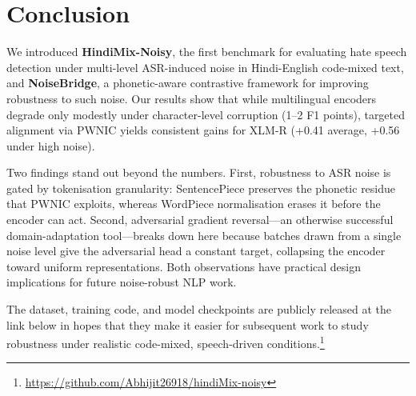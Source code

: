 \documentclass[conference]{IEEEtran}
\begin{document}
\section{Conclusion}

We introduced \textbf{HindiMix-Noisy}, the first benchmark for evaluating hate speech detection under multi-level ASR-induced noise in Hindi-English code-mixed text, and \textbf{NoiseBridge}, a phonetic-aware contrastive framework for improving robustness to such noise. Our results show that while multilingual encoders degrade only modestly under character-level corruption (1--2 F1 points), targeted alignment via PWNIC yields consistent gains for XLM-R (+0.41 average, +0.56 under high noise).

Two findings stand out beyond the numbers. First, robustness to ASR noise is gated by tokenisation granularity: SentencePiece preserves the phonetic residue that PWNIC exploits, whereas WordPiece normalisation erases it before the encoder can act. Second, adversarial gradient reversal---an otherwise successful domain-adaptation tool---breaks down here because batches drawn from a single noise level give the adversarial head a constant target, collapsing the encoder toward uniform representations. Both observations have practical design implications for future noise-robust NLP work.

The dataset, training code, and model checkpoints are publicly released at the link below in hopes that they make it easier for subsequent work to study robustness under realistic code-mixed, speech-driven conditions.\footnote{\url{https://github.com/Abhijit26918/hindiMix-noisy}}
\end{document}
